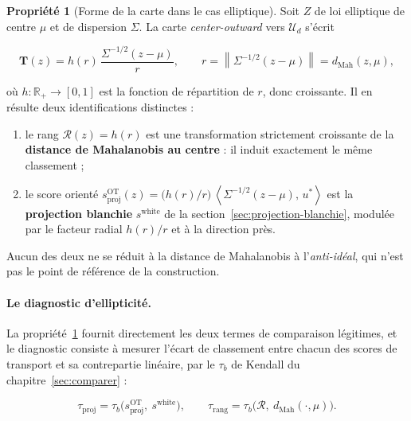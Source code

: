 \documentclass[11pt,a4paper]{article}
\theoremstyle{definition}
\newtheorem{propriete}{Propriété}[section]
\theoremstyle{remark}
\newcommand{\R}{\mathbb{R}}
\newcommand{\Unif}{\mathcal{U}}
\newcommand{\norm}[1]{\left\lVert #1 \right\rVert}
\newcommand{\scal}[2]{\left\langle #1 ,\, #2 \right\rangle}
\newcommand{\Tmap}{\mathbf{T}}
\begin{document}
\medskip

\begin{propriete}[Forme de la carte dans le cas elliptique]
  \label{prop:ot-elliptique}
  Soit $Z$ de loi elliptique de centre $\mu$ et de dispersion $\Sigma$. La carte
  \emph{center-outward} vers $\Unif_d$ s'écrit

  \medskip

  \[
    \Tmap(z) = h(r)\,\frac{\Sigma^{-1/2}(z-\mu)}{r},
    \qquad r = \norm{\Sigma^{-1/2}(z-\mu)} = d_{\mathrm{Mah}}(z,\mu),
  \]

  \bigskip

  où $h : \R_+ \to [0,1]$ est la fonction de répartition de $r$, donc croissante. Il en
  résulte deux identifications distinctes :

  \medskip

  \begin{enumerate}[nosep,leftmargin=1.8em]
    \item le rang $\mathcal{R}(z) = h(r)$ est une transformation strictement croissante de
    la \textbf{distance de Mahalanobis au centre} : il induit exactement le même
    classement ;
    \item le score orienté $s^{\mathrm{OT}}_{\mathrm{proj}}(z) =
    \big(h(r)/r\big)\,\scal{\Sigma^{-1/2}(z-\mu)}{u^{*}}$ est la \textbf{projection
    blanchie} $s^{\mathrm{white}}$ de la section~\ref{sec:projection-blanchie}, modulée par
    le facteur radial $h(r)/r$ et à la direction près.
  \end{enumerate}

  \medskip

  Aucun des deux ne se réduit à la distance de Mahalanobis à l'\emph{anti-idéal}, qui n'est
  pas le point de référence de la construction.
\end{propriete}

\bigskip

\paragraph{Le diagnostic d'ellipticité.} La propriété~\ref{prop:ot-elliptique} fournit
directement les deux termes de comparaison légitimes, et le diagnostic consiste à mesurer
l'écart de classement entre chacun des scores de transport et sa contrepartie linéaire, par
le $\tau_b$ de Kendall du chapitre~\ref{sec:comparer} :

\medskip

\[
  \tau_{\mathrm{proj}}
  = \tau_b\big(s^{\mathrm{OT}}_{\mathrm{proj}},\ s^{\mathrm{white}}\big),
  \qquad
  \tau_{\mathrm{rang}}
  = \tau_b\big(\mathcal{R},\ d_{\mathrm{Mah}}(\cdot,\mu)\big).
\]
\end{document}
